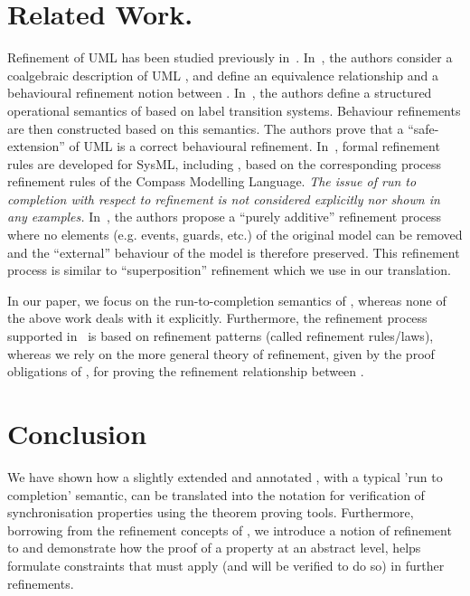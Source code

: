 \section{Related Work.} 
\label{sec:related}
Refinement of UML \statecharts has been  studied previously in~\cite{MeNaBa04,SzVi10,MiCa14,HaSyLu15,LiMiCaCoTySaHaLaLe17}. 
In~\cite{MeNaBa04}, the authors consider a coalgebraic description of UML \statecharts, and define an equivalence relationship and a behavioural refinement notion between \statecharts. 
In~\cite{SzVi10}, the authors define a structured operational semantics of \statecharts based on label transition systems.  
Behaviour refinements are then constructed based on this semantics. 
The authors prove that a ``safe-extension'' of UML \statecharts is a correct behavioural refinement.
In~\cite{MiCa14,LiMiCaCoTySaHaLaLe17}, formal refinement rules are developed for SysML, including \statecharts, based on the corresponding process refinement rules of the Compass Modelling Language. 
\emph{The issue of run to completion with respect to refinement is not considered explicitly  nor shown in any examples.}
In~\cite{HaSyLu15}, the authors propose  a ``purely additive'' refinement process where no elements (e.g. events, guards, etc.) of the original model can be removed and the ``external'' behaviour of the model is therefore preserved.  
This refinement process is similar to \EventB ``superposition'' refinement which we use in our translation.  

In our paper, we focus on the run-to-completion semantics of \statecharts, whereas none of the above work deals with it explicitly. 
Furthermore, the refinement process supported in~\cite{MeNaBa04,MiCa14,HaSyLu15,LiMiCaCoTySaHaLaLe17} is based on refinement patterns (called refinement rules/laws), whereas we rely on the more general theory of refinement, given by the proof obligations of \EventB, for proving the refinement relationship between \statecharts.

\section{Conclusion}
\label{sec:conclusion}
We have shown how a slightly extended and annotated \statechart, with a typical 'run to completion' semantic, can be translated into the \EventB notation for verification of synchronisation properties using the \EventB theorem proving tools.
Furthermore, borrowing from the refinement concepts of \EventB, we introduce a notion of refinement to \statecharts and demonstrate how the proof of a property at an abstract level, helps formulate constraints that must apply (and will be verified to do so) in further refinements.


